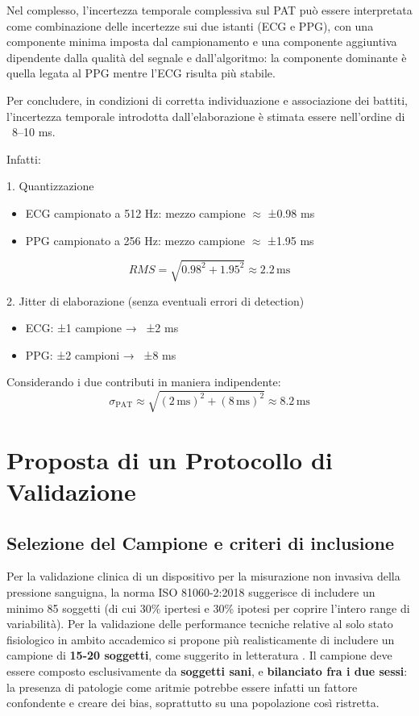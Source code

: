 \documentclass[11pt,a4paper]{article}
\begin{document}
Nel complesso, l’incertezza temporale complessiva sul PAT può essere interpretata come combinazione delle incertezze sui due istanti (ECG e PPG), con una componente minima imposta dal campionamento e una componente aggiuntiva dipendente dalla qualità del segnale e dall’algoritmo: la componente dominante è quella legata al PPG mentre l’ECG risulta più stabile.

Per concludere, in condizioni di corretta individuazione e associazione dei battiti, l’incertezza temporale introdotta dall’elaborazione è stimata essere nell’ordine di ~8–10 ms. 

Infatti:

1. Quantizzazione
\begin{itemize}
    \item ECG campionato a 512 Hz: mezzo campione $ ≈ $ ±0.98 ms 
    \item PPG campionato a 256 Hz: mezzo campione $ ≈ $ ±1.95 ms 
\end{itemize}

\[
RMS = \sqrt{0.98^2 + 1.95^2} \approx 2.2\,\text{ms}
\]


2. Jitter di elaborazione (senza eventuali errori di detection)

\begin{itemize}
    \item ECG: ±1 campione → ~±2 ms
    \item PPG: ±2 campioni → ~±8 ms 
\end{itemize}

Considerando i due contributi in maniera indipendente:
\[
\sigma_{\mathrm{PAT}} \approx \sqrt{(2\,\text{ms})^2 + (8\,\text{ms})^2} \approx 8.2\,\text{ms}
\]

\section{Proposta di un Protocollo di Validazione}
\subsection{Selezione del Campione e criteri di inclusione}
Per la validazione clinica di un dispositivo per la misurazione non invasiva della pressione sanguigna, la norma ISO 81060-2:2018 \cite{iso81060} suggerisce di includere un minimo 85 soggetti (di cui 30\% ipertesi e 30\% ipotesi per coprire l'intero range di variabilità). Per la validazione delle performance tecniche relative al solo stato fisiologico in ambito accademico si propone più realisticamente di includere un campione di \textbf{15-20 soggetti}, come suggerito in letteratura \cite{mukkamala2015}. Il campione deve essere composto esclusivamente da \textbf{soggetti sani}, e \textbf{bilanciato fra i due sessi}: la presenza di patologie come aritmie potrebbe essere infatti un fattore confondente e creare dei bias, soprattutto su una popolazione così ristretta.   
\end{document}
